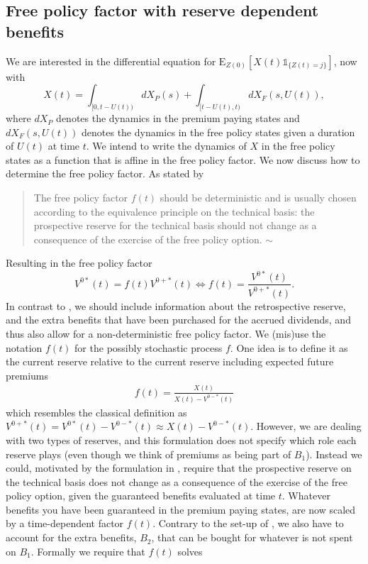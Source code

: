 \documentclass[12pt]{article}
\newcommand{\E}{\text{E}}
\newcommand{\indic}[1]{\mathds{1}_{ \{ #1 \} }}
\begin{document}
\subsection*{Free policy factor with reserve dependent benefits}
We are interested in the differential equation for $\E_{Z(0)}[X(t)\indic{Z(t)=j}]$, now with
$$
X(t)=\int_{[0,t-U(t))} dX_P(s)+\int_{[t-U(t),t)} dX_F(s,U(t)),
$$
where $dX_P$ denotes the dynamics in the premium paying states and $dX_F(s,U(t))$ denotes the dynamics in the free policy states given a duration of $U(t)$ at time $t$. We intend to write the dynamics of $X$ in the free policy states as a function that is affine in the free policy factor. We now discuss how to determine the free policy factor. As stated by \citet{THM_BUC}
\begin{quote}
The free policy factor $f(t)$ should be deterministic and is usually chosen according to the equivalence principle on the technical basis: the prospective reserve for the technical basis should not change as a consequence of the exercise of the free policy option. \newline $\sim$ \citet{THM_BUC}
\end{quote}
Resulting in the free policy factor
$$
V^{0*}(t)=f(t)V^{0+*}(t) \Leftrightarrow f(t)=\frac{V^{0*}(t)}{V^{0+*}(t)}.
$$
In contrast to \citet{THM_BUC}, we should include information about the retrospective reserve, and the extra benefits that have been purchased for the accrued dividends, and thus also allow for a non-deterministic free policy factor. We (mis)use the notation $f(t)$ for the possibly stochastic process $f$. One idea is to define it as the current reserve relative to the current reserve including expected future premiums
\begin{align}
f(t)=\frac{X(t)}{X(t)-V^{0-*}(t)} \label{eq:AAH}
\end{align}
which resembles the classical definition as $V^{0+*}(t)=V^{0*}(t)-V^{0-*}(t) \approx X(t) - V^{0-*}(t)$. However, we are dealing with two types of reserves, and this formulation does not specify which role each reserve plays (even though we think of premiums as being part of $B_1$). 
Instead we could, motivated by the formulation in \citet{THM_BUC}, require that the prospective reserve on the technical basis does not change as a consequence of the exercise of the free policy option, given the guaranteed benefits evaluated at time $t$. Whatever benefits you have been guaranteed in the premium paying states, are now scaled by a time-dependent factor $f(t)$. Contrary to the set-up of \citet{THM_BUC}, we also have to account for the extra benefits, $B_2$, that can be bought for whatever is not spent on $B_1$. Formally we require that $f(t)$ solves
\end{document}
